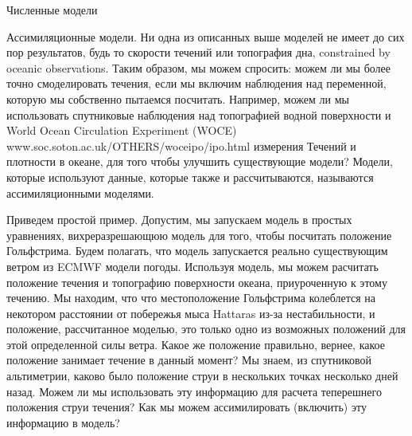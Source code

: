\begin{chapter}{Численные модели}
\begin{section}{Ассимиляционные модели.}
Ни одна из описанных выше моделей не имеет до сих пор результатов,
будь то скорости течений или топография дна, constrained by oceanic
observations. Таким образом, мы можем спросить: можем ли мы более
точно смоделировать течения, если мы включим наблюдения над
переменной, которую мы собственно пытаемся посчитать. Например, можем
ли мы использовать спутниковые наблюдения над топографией водной
поверхности и World Ocean Circulation Experiment (WOCE)
www.soc.soton.ac.uk/OTHERS/woceipo/ipo.html измерения Течений и
плотности в океане, для того чтобы улучшить существующие модели?
Модели, которые используют данные, которые также и рассчитываются,
называются ассимиляционными моделями.
%

Приведем простой пример. Допустим, мы запускаем модель в простых
уравнениях, вихреразрешающюю модель для того, чтобы посчитать
положение Гольфстрима. Будем полагать, что модель запускается реально
существующим ветром из ECMWF модели погоды. Используя модель, мы можем
расчитать положение течения и топографию поверхности океана,
приуроченную к этому течению. Мы находим, что что местоположение
Гольфстрима колеблется на некотором расстоянии от побережья мыса
Hattaras из-за нестабильности, и положение, рассчитанное моделью, это
только одно из возможных положений для этой определенной силы
ветра. Какое же положение правильно, вернее, какое положение занимает
течение в данный момент? Мы знаем, из спутниковой альтиметрии, каково
было положение струи в нескольких точках несколько дней назад. Можем
ли мы использовать эту информацию для расчета теперешнего положения
струи течения? Как мы можем ассимилировать (включить) эту информацию в
модель?
%


\end{section}
\end{chapter}
